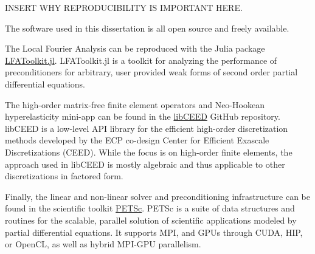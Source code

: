 INSERT WHY REPRODUCIBILITY IS IMPORTANT HERE.

The software used in this dissertation is all open source and freely available.

The Local Fourier Analysis can be reproduced with the Julia package \href{https://www.github.com/jeremylt/LFAToolkit.jl}{LFAToolkit.jl}. LFAToolkit.jl is a toolkit for analyzing the performance of preconditioners for arbitrary, user provided weak forms of second order partial differential equations.

The high-order matrix-free finite element operators and Neo-Hookean hyperelasticity mini-app can be found in the \href{https://www.github.com/CEED/libCEED}{libCEED} GitHub repository.
libCEED is a low-level API library for the efficient high-order discretization methods developed by the ECP co-design Center for Efficient Exascale Discretizations (CEED). While the focus is on high-order finite elements, the approach used in libCEED is mostly algebraic and thus applicable to other discretizations in factored form.

Finally, the linear and non-linear solver and preconditioning infrastructure can be found in the scientific toolkit \href{https://www.mcs.anl.gov/petsc/}{PETSc}.
PETSc is a suite of data structures and routines for the scalable, parallel solution of scientific applications modeled by partial differential equations. It supports MPI, and GPUs through CUDA, HIP, or OpenCL, as well as hybrid MPI-GPU parallelism.
